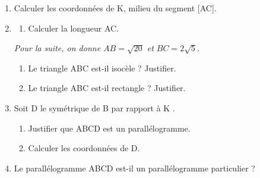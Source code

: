 \documentclass[12pt,french,oneside]{report}
\begin{document}
\begin{spacing}{1.2}
\begin{Exercice}[(7,5 points)]
\begin{enumerate}
\begin{center}
\end{center}

\item Calculer les coordonnées de K, milieu du segment [AC].

\item 	\begin{enumerate}
	\item Calculer la longueur AC.
	\end{enumerate}
	
	\textit{Pour la suite, on donne $AB=\sqrt{20}$ et $BC=2\sqrt{5}$.}
	
	\begin{enumerate}[start=2]
	\item Le triangle ABC est-il isocèle ? Justifier.
	
	\item Le triangle ABC est-il rectangle ? Justifier.
	
	\end{enumerate}
\item Soit D le symétrique de B par rapport à K . 

\begin{enumerate}
\item Justifier que ABCD est un parallélogramme.

\item Calculer les coordonnées de D.

\end{enumerate}

\item %
Le parallélogramme ABCD est-il un parallélogramme particulier ?


\end{enumerate}
\end{Exercice}
\end{spacing}
\end{document}
